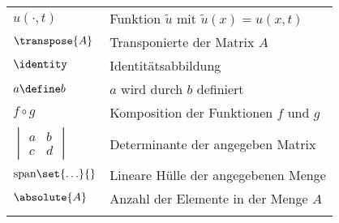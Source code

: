 \documentclass[crop=false,10pt,ngerman]{standalone}
\begin{document}
\begin{table}[H]
\begin{tabularx}{\textwidth}{p{}p{}}
			$u(\cdot,t)$ & Funktion $\tilde{u}$ mit $\tilde{u}(x) = u(x,t)$ \\
			$\transpose{A}$ & Transponierte der Matrix $A$ \\
			$\identity$ & Identitätsabbildung \\
			$a\define b$ & $a$ wird durch $b$ definiert \\
			$f\circ g$ & Komposition der Funktionen $f$ und $g$ \\
			$\begin{vmatrix} a & b \\ c & d \end{vmatrix}$ & Determinante der angegeben Matrix \\
			$\mathrm{span}\set{\ldots}{}$ & Lineare Hülle der angegebenen Menge \\
			$\absolute{A}$ & Anzahl der Elemente in der Menge $A$ \\
			\\
			\hline
		\end{tabularx}
	\end{table}
\end{document}
